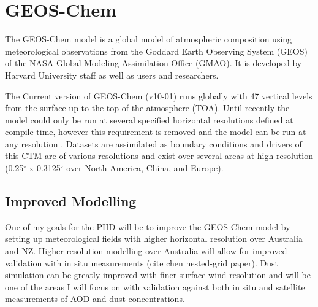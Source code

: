 \section{GEOS-Chem}
The GEOS-Chem model is a global model of atmospheric composition using meteorological observations from the Goddard Earth Observing System (GEOS) of the NASA Global Modeling Assimilation Office (GMAO). It is developed by Harvard University staff as well as users and researchers. 

The Current version of GEOS-Chem (v10-01) runs globally with 47 vertical levels from the surface up to the top of the atmosphere (TOA). 
Until recently the model could only be run at several specified horizontal resolutions defined at compile time, however this requirement is removed and the model can be run at any resolution \cite{Long_2015}.
Datasets are assimilated as boundary conditions and drivers of this CTM are of various resolutions and exist over several areas at high resolution (0.25$^{\circ}$ x 0.3125$^{\circ}$ over North America, China, and Europe).

\subsection{Improved Modelling}
One of my goals for the PHD will be to improve the GEOS-Chem model by setting up meteorological fields with higher horizontal resolution over Australia and NZ.
Higher resolution modelling over Australia will allow for improved validation with in situ measurements (cite chen nested-grid paper). 
Dust simulation can be greatly improved with finer surface wind resolution and will be one of the areas I will focus on with validation against both in situ and satellite measurements of AOD and dust concentrations.


  